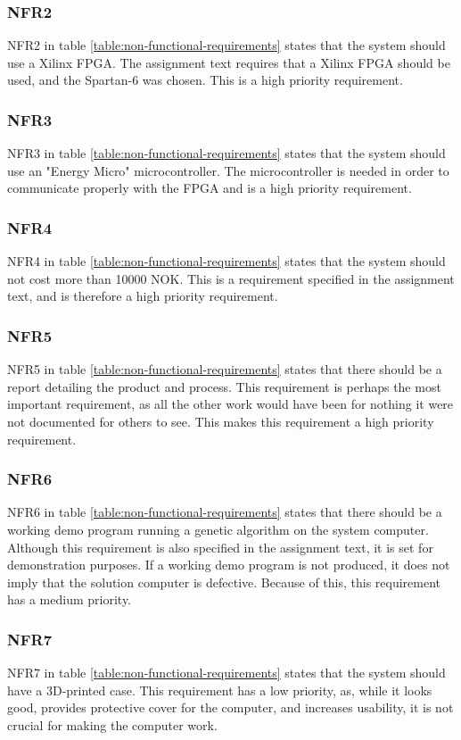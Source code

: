 \subsubsection{NFR2}

NFR2 in table \vref{table:non-functional-requirements} states that the system should use a Xilinx FPGA.
The assignment text requires that a Xilinx FPGA should be used, and the Spartan-6 was chosen. This is a high priority requirement. 

\subsubsection{NFR3}

NFR3 in table \vref{table:non-functional-requirements} states that the system should use an "Energy Micro" microcontroller.
The microcontroller is needed in order to communicate properly with the FPGA and is a high priority requirement.

\subsubsection{NFR4}

NFR4 in table \vref{table:non-functional-requirements} states that the system should not cost more than 10000 NOK.
This is a requirement specified in the assignment text, and is therefore a high priority requirement.

\subsubsection{NFR5}

NFR5 in table \vref{table:non-functional-requirements} states that there should be a report detailing the product and process.
This requirement is perhaps the most important requirement, as all the other work would have been for nothing it were not documented for others to see.
This makes this requirement a high priority requirement.

\subsubsection{NFR6}

NFR6 in table \vref{table:non-functional-requirements} states that there should be a working demo program running a genetic algorithm on the system computer.
Although this requirement is also specified in the assignment text, it is set for demonstration purposes.
If a working demo program is not produced, it does not imply that the solution computer is defective.
Because of this, this requirement has a medium priority.

\subsubsection{NFR7}

NFR7 in table \vref{table:non-functional-requirements} states that the system should have a 3D-printed case.
This requirement has a low priority, as, while it looks good, provides protective cover for the computer, and increases usability, it is not crucial for making the computer work.

